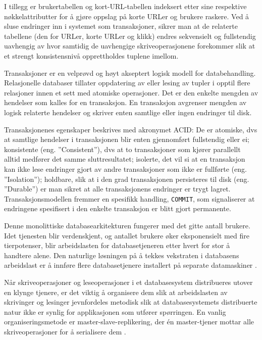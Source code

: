 I tillegg er brukertabellen og kort-URL-tabellen indeksert etter sine respektive nøkkelattributter for å gjøre oppslag på korte URLer og brukere raskere. Ved å sluse endringer inn i systemet som transaksjoner, sikrer man at de relaterte tabellene (den for URLer, korte URLer og klikk) endres sekvensielt og fullstendig uavhengig av hvor samtidig de uavhengige skriveoperasjonene forekommer slik at et strengt konsistensnivå opprettholdes tuplene imellom.

Transaksjoner er en velprøvd og høyt akseptert logisk modell for databehandling. Relasjonelle databaser tillater oppdatering av eller lesing av tupler i opptil flere relasjoner innen et sett med atomiske operasjoner. Det er den enkelte mengden av hendelser som kalles for en transaksjon. En transaksjon avgrenser mengden av logisk relaterte hendelser og skriver enten samtlige eller ingen endringer til disk.

Transaksjonenes egenskaper beskrives med akronymet ACID: De er atomiske, dvs at samtlige hendelser i transaksjonen blir enten gjennomført fullstendig eller ei; konsistente (eng. ''Consistent''), dvs at to transaksjoner som kjører parallellt alltid medfører det samme sluttresultatet; isolerte, det vil si at en transaksjon kan ikke lese endringer gjort av andre transaksjoner som ikke er fullførte (eng. ''Isolation''); holdbare, slik at i den grad transaksjonen persisteres til disk (eng. ''Durable'') er man sikret at alle transaksjonens endringer er trygt lagret. Transaksjonsmodellen fremmer en spesifikk handling, \texttt{COMMIT}, som signaliserer at endringene spesifisert i den enkelte transaksjon er blitt gjort permanente.

Denne monolittiske databasearkitekturen fungerer med det gitte antall brukere. Idet tjenesten blir verdenskjent, og antallet brukere øker eksponensielt med fire tierpotenser, blir arbeidslasten for databasetjeneren etter hvert for stor å handtere alene. Den naturlige løsningen på å tekkes vekstraten i databasens arbeidslast er å innføre flere databasetjenere installert på separate datamaskiner \citep{george2011}.

Når skriveoperasjoner og leseoperasjoner i et databasesystem distribueres utover en klynge tjenere, er det viktig å organisere dem slik at arbeidslasten av skrivinger og lesinger jevnfordeles metodisk slik at databasesystemets distribuerte natur ikke er synlig for applikasjonen som utfører spørringen. En vanlig organiseringsmetode er master-slave-replikering, der én master-tjener mottar alle skriveoperasjoner for å serialisere dem \citep{george2011}.

